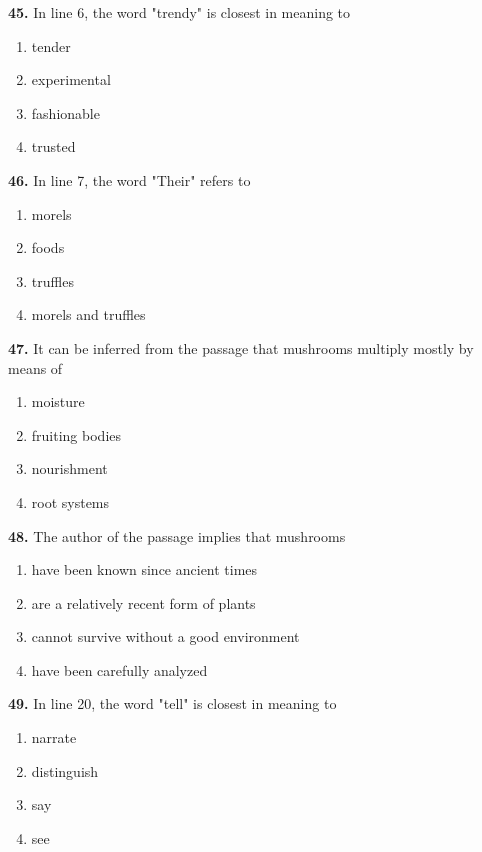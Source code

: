\documentclass[12pt]{article}
\begin{document}
\vspace{0.25\baselineskip}
\noindent\textbf{45.} In line 6, the word "trendy" is closest in meaning to
\begin{enumerate}[label=(\Alph*),leftmargin=*,itemsep=0.2em]
\item tender
\item experimental
\item fashionable
\item trusted
\end{enumerate}
\par
\vspace{0.25\baselineskip}
\noindent\textbf{46.} In line 7, the word "Their" refers to
\begin{enumerate}[label=(\Alph*),leftmargin=*,itemsep=0.2em]
\item morels
\item foods
\item truffles
\item morels and truffles
\end{enumerate}
\par
\vspace{0.25\baselineskip}
\noindent\textbf{47.} It can be inferred from the passage that mushrooms multiply mostly by means of
\begin{enumerate}[label=(\Alph*),leftmargin=*,itemsep=0.2em]
\item moisture
\item fruiting bodies
\item nourishment
\item root systems
\end{enumerate}
\par
\vspace{0.25\baselineskip}
\noindent\textbf{48.} The author of the passage implies that mushrooms
\begin{enumerate}[label=(\Alph*),leftmargin=*,itemsep=0.2em]
\item have been known since ancient times
\item are a relatively recent form of plants
\item cannot survive without a good environment
\item have been carefully analyzed
\end{enumerate}
\par
\vspace{0.25\baselineskip}
\noindent\textbf{49.} In line 20, the word "tell" is closest in meaning to
\begin{enumerate}[label=(\Alph*),leftmargin=*,itemsep=0.2em]
\item narrate
\item distinguish
\item say
\item see
\end{enumerate}
\end{document}
